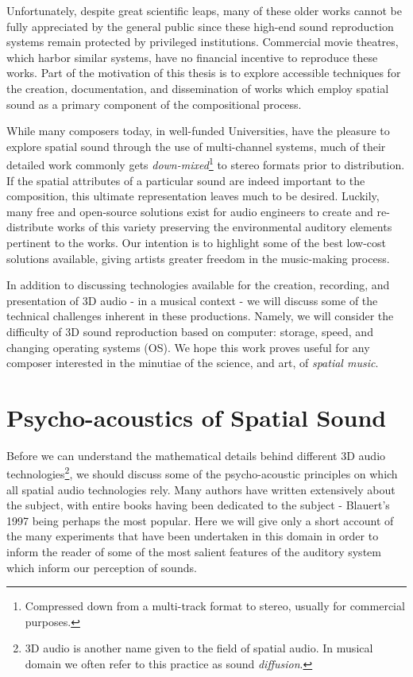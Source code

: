 Unfortunately, despite great scientific leaps, many of these older works cannot be fully appreciated by the general public since these high-end sound reproduction systems remain protected by privileged institutions. Commercial movie theatres, which harbor similar systems, have no financial incentive to reproduce these works. Part of the motivation of this thesis is to explore accessible techniques for the creation, documentation, and dissemination of works which employ spatial sound as a primary component of the compositional process. 

While many composers today, in well-funded Universities, have the pleasure to explore spatial sound through the use of multi-channel systems, much of their detailed work commonly gets \textit{down-mixed}\footnote{Compressed down from a multi-track format to stereo, usually for commercial purposes.} to stereo formats prior to distribution. If the spatial attributes of a particular sound are indeed important to the composition, this ultimate representation leaves much to be desired. Luckily, many free and open-source solutions exist for audio engineers to create and re-distribute works of this variety preserving the environmental auditory elements pertinent to the works. Our intention is to highlight some of the best low-cost solutions available, giving artists greater freedom in the music-making process.

In addition to discussing technologies available for the creation, recording, and presentation of 3D audio - in a musical context - we will discuss some of the technical challenges inherent in these productions. Namely, we will consider the difficulty of 3D sound reproduction based on computer: storage, speed, and changing operating systems (OS). We hope this work proves useful for any composer interested in the minutiae of the science, and art, of \textit{spatial music}.

\section{Psycho-acoustics of Spatial Sound}

Before we can understand the mathematical details behind different 3D audio technologies\footnote{3D audio is another name given to the field of spatial audio. In musical domain we often refer to this practice as sound \textit{diffusion}.}, we should discuss some of the psycho-acoustic principles on which all spatial audio technologies rely. Many authors have written extensively about the subject, with entire books having been dedicated to the subject - Blauert's 1997 \cite{blauert1997spatial} being perhaps the most popular. Here we will give only a short account of the many experiments that have been undertaken in this domain in order to inform the reader of some of the most salient features of the auditory system which inform our perception of sounds.

